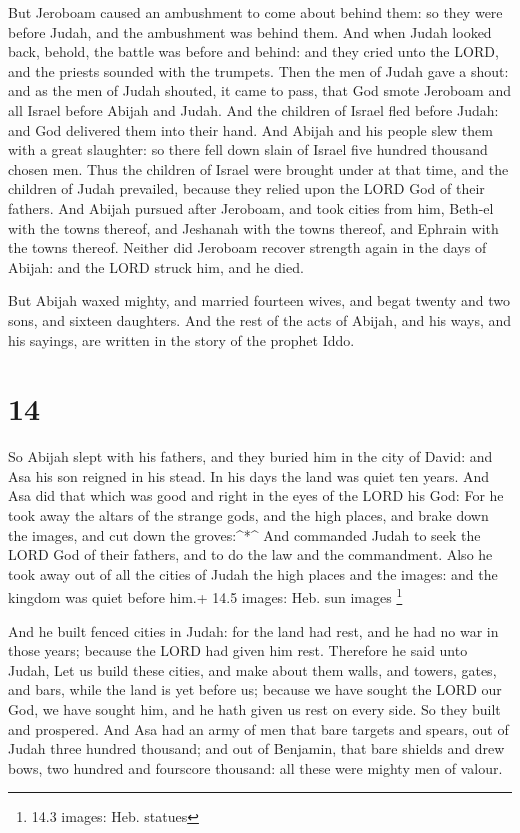  But Jeroboam caused an ambushment to come about behind
them: so they were before Judah, and the ambushment was behind them.
 And when Judah looked back, behold, the battle was before
and behind: and they cried unto the LORD, and the priests sounded with
the trumpets.  Then the men of Judah gave a shout: and as
the men of Judah shouted, it came to pass, that God smote Jeroboam and
all Israel before Abijah and Judah.  And the children of
Israel fled before Judah: and God delivered them into their hand.
 And Abijah and his people slew them with a great
slaughter: so there fell down slain of Israel five hundred thousand
chosen men.  Thus the children of Israel were brought under
at that time, and the children of Judah prevailed, because they relied
upon the LORD God of their fathers.  And Abijah pursued
after Jeroboam, and took cities from him, Beth-el with the towns
thereof, and Jeshanah with the towns thereof, and Ephrain with the towns
thereof.  Neither did Jeroboam recover strength again in
the days of Abijah: and the LORD struck him, and he died.

 But Abijah waxed mighty, and married fourteen wives, and
begat twenty and two sons, and sixteen daughters.  And the
rest of the acts of Abijah, and his ways, and his sayings, are written
in the story of the prophet Iddo.

\hypertarget{section-13}{%
\section{14}\label{section-13}}

 So Abijah slept with his fathers, and they buried him in
the city of David: and Asa his son reigned in his stead. In his days the
land was quiet ten years.  And Asa did that which was good
and right in the eyes of the LORD his God:  For he took away
the altars of the strange gods, and the high places, and brake down the
images, and cut down the groves:\^{}*\^{}  And commanded
Judah to seek the LORD God of their fathers, and to do the law and the
commandment.  Also he took away out of all the cities of
Judah the high places and the images: and the kingdom was quiet before
him.+ 14.5 images: Heb. sun images \footnote{14.3 images: Heb. statues}

 And he built fenced cities in Judah: for the land had rest,
and he had no war in those years; because the LORD had given him rest.
 Therefore he said unto Judah, Let us build these cities,
and make about them walls, and towers, gates, and bars, while the land
is yet before us; because we have sought the LORD our God, we have
sought him, and he hath given us rest on every side. So they built and
prospered.  And Asa had an army of men that bare targets and
spears, out of Judah three hundred thousand; and out of Benjamin, that
bare shields and drew bows, two hundred and fourscore thousand: all
these were mighty men of valour.


